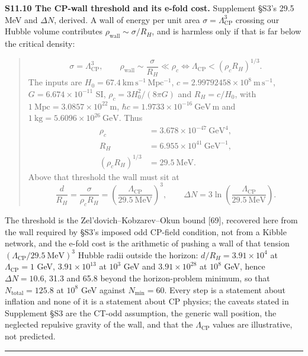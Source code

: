 \documentclass[
]{article}
\newcounter{none} %
\begin{document}
\textbf{S11.10 The CP-wall threshold and its e-fold cost.} Supplement
§S3's 29.5 MeV and \(\Delta N\), derived. A wall of energy per unit area
\(\sigma=\Lambda_{\mathrm{CP}}^3\) crossing our Hubble volume
contributes \(\rho_{\mathrm{wall}}\sim\sigma/R_H\), and is harmless only
if that is far below the critical density:

\begin{quote}
\[
\sigma=\Lambda_{\mathrm{CP}}^3,\qquad
\rho_{\mathrm{wall}}\sim\frac{\sigma}{R_H}\ll\rho_c
\Longleftrightarrow
\Lambda_{\mathrm{CP}}<(\rho_cR_H)^{1/3}.
\] The inputs are \(H_0=67.4\ \mathrm{km\,s^{-1}\,Mpc^{-1}}\),
\(c=2.99792458\times10^8\ \mathrm{m\,s^{-1}}\),
\(G=6.674\times10^{-11}\) SI, \(\rho_c=3H_0^2/(8\pi G)\) and
\(R_H=c/H_0\), with \(1\ \mathrm{Mpc}=3.0857\times10^{22}\ \mathrm m\),
\(\hbar c=1.9733\times10^{-16}\ \mathrm{GeV\,m}\) and
\(1\ \mathrm{kg}=5.6096\times10^{26}\ \mathrm{GeV}\). Thus \[
\begin{aligned}
\rho_c&=3.678\times10^{-47}\ \mathrm{GeV}^4,\\
R_H&=6.955\times10^{41}\ \mathrm{GeV}^{-1},\\
(\rho_cR_H)^{1/3}&=29.5\ \mathrm{MeV}.
\end{aligned}
\] Above that threshold the wall must sit at \[
\frac{d}{R_H}=\frac{\sigma}{\rho_cR_H}
=\left(\frac{\Lambda_{\mathrm{CP}}}{29.5\ \mathrm{MeV}}\right)^3,
\qquad
\Delta N=3\ln\!\left(\frac{\Lambda_{\mathrm{CP}}}{29.5\ \mathrm{MeV}}\right).
\]
\end{quote}

The threshold is the Zel'dovich--Kobzarev--Okun bound {[}69{]},
recovered here from the wall required by §S3's imposed odd CP-field
condition, not from a Kibble network, and the e-fold cost is the
arithmetic of pushing a wall of that tension
\((\Lambda_{\mathrm{CP}}/29.5\ \mathrm{MeV})^3\) Hubble radii outside
the horizon: \(d/R_H=3.91\times10^4\) at \(\Lambda_{\mathrm{CP}}=1\)
GeV, \(3.91\times10^{13}\) at \(10^3\) GeV and \(3.91\times10^{28}\) at
\(10^8\) GeV, hence \(\Delta N=10.6\), 31.3 and 65.8 beyond the
horizon-problem minimum, so that \(N_{\mathrm{total}}=125.8\) at
\(10^8\) GeV against \(N_{\min}=60\). Every step is a statement about
inflation and none of it is a statement about CP physics; the caveats
stated in Supplement §S3 are the CT-odd assumption, the generic wall
position, the neglected repulsive gravity of the wall, and that the
\(\Lambda_{\mathrm{CP}}\) values are illustrative, not predicted.

\begin{center}\rule{0.5\linewidth}{0.5pt}\end{center}
\end{document}
